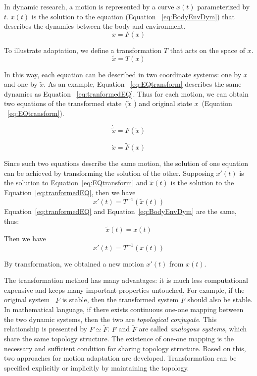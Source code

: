 In dynamic \cms research, a motion is represented by  a curve  $x(t)$ parameterized by $t$.
$x(t)$ is the solution to the equation (Equation ~\ref{eq:BodyEnvDym}) that describes the dynamics between the body and environment.
\begin{equation}
\dot{x}=F(x)
\label{eq:BodyEnvDym}
\end{equation}


To illustrate adaptation, we define a transformation $T$ that acts on the space of $x$.
\[
\tilde{x}=T(x)
\]

In this way, each equation can be described in two coordinate systems: one by $x$ and one by $\tilde{x}$.
As an example, Equation ~\ref{eq:EQtransform} describes the same dynamics as  Equation ~\ref{eq:tranformedEQ}.
Thus for each motion, we can obtain two equations of the transformed state~($\tilde{x}$ ) and original state $x$~(Equation ~\ref{eq:EQtransform}).

\begin{equation}
\dot{\tilde{x}}=F(\tilde{x})
\label{eq:tranformedEQ}
\end{equation}

\begin{equation}
\dot{x}=\tilde{F}(x)
\label{eq:EQtransform}
\end{equation}

Since such two equations describe the same motion, the solution of one equation can be achieved by transforming the solution of the other.
Supposing $x'(t)$ is the solution to Equation~\ref{eq:EQtransform} and $\tilde{x}(t)$ is the solution to the Equation~\ref{eq:tranformedEQ}, then we have
\[
x'(t)=T^{-1}(\tilde{x}(t))
\]
Equation~\ref{eq:tranformedEQ} and Equation~\ref{eq:BodyEnvDym} are the same, thus: 
\[
\tilde{x}(t)=x(t)
\]
Then we have
\[
x'(t)=T^{-1}(x(t))
\]

By transformation, we obtained a new motion $x'(t)$ from $x(t)$.





%
%
The  transformation method has many advantages: it is much less computational expensive and keeps many important properties untouched.
For example, if the original system ~$F$ is stable, then the transformed system $\tilde{F}$ should also be stable. 
%
In mathematical language, if there exists continuous one-one mapping between the two dynamic systems, then the two are \emph{topological conjugate}.
This relationship is presented by $F \simeq \tilde{F}$.
$F$ and $\tilde{F}$ are called \emph{analogous systems}, which share the same topology structure.
The existence of one-one mapping is the necessary and sufficient condition for sharing topology structure.
Based on this, two  approaches for motion adaptation are developed.
Transformation can be specified explicitly or implicitly by maintaining the topology.



